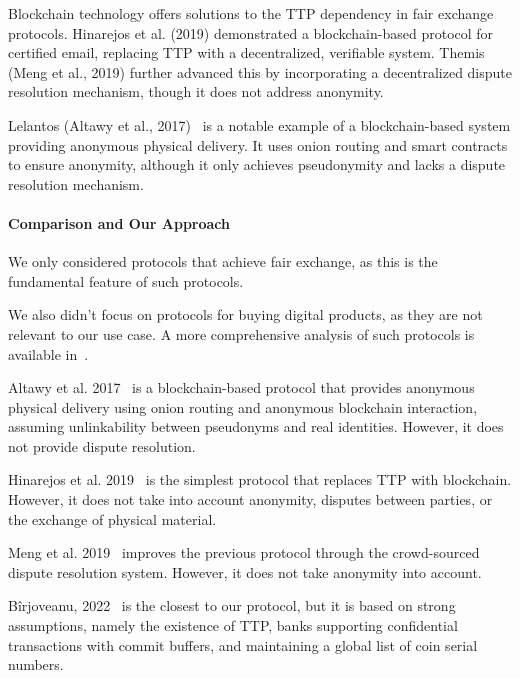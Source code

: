 \documentclass[pdftex,twocolumn,epjc3]{svjour3}
\begin{document}
Blockchain technology offers solutions to the TTP dependency in fair exchange protocols. Hinarejos et al. (2019)\cite{hinarejosSolutionSecureCertified2019} demonstrated a blockchain-based protocol for certified email, replacing TTP with a decentralized, verifiable system. Themis (Meng et al., 2019)\cite{mengThemisDecentralizedEscrow2019} further advanced this by incorporating a decentralized dispute resolution mechanism, though it does not address anonymity.

Lelantos (Altawy et al., 2017)~\cite{altawyLelantosBlockchainBasedAnonymous2017} is a notable example of a blockchain-based system providing anonymous physical delivery. It uses onion routing and smart contracts to ensure anonymity, although it only achieves pseudonymity and lacks a dispute resolution mechanism.

\paragraph{Comparison and Our Approach}

We only considered protocols that achieve fair exchange, as this is the fundamental feature of such protocols.

We also didn't focus on protocols for buying digital products, as they are not relevant to our use case. A more comprehensive analysis of such protocols is available in~\cite{birjoveanuTwoPartyECommerceProtocols2022}.

Altawy et al. 2017~\cite{altawyLelantosBlockchainBasedAnonymous2017} is a blockchain-based protocol that provides anonymous physical delivery using onion routing and anonymous blockchain interaction, assuming unlinkability between pseudonyms and real identities. However, it does not provide dispute resolution.

Hinarejos et al. 2019~\cite{hinarejosSolutionSecureCertified2019} is the simplest protocol that replaces TTP with blockchain. However, it does not take into account anonymity, disputes between parties, or the exchange of physical material.

Meng et al. 2019~\cite{mengThemisDecentralizedEscrow2019} improves the previous protocol through the crowd-sourced dispute resolution system. However, it does not take anonymity into account.

Bîrjoveanu, 2022~\cite{birjoveanuTwoPartyECommerceProtocols2022} is the closest to our protocol, but it is based on strong assumptions, namely the existence of TTP, banks supporting confidential transactions with commit buffers, and maintaining a global list of coin serial numbers.
\end{document}
